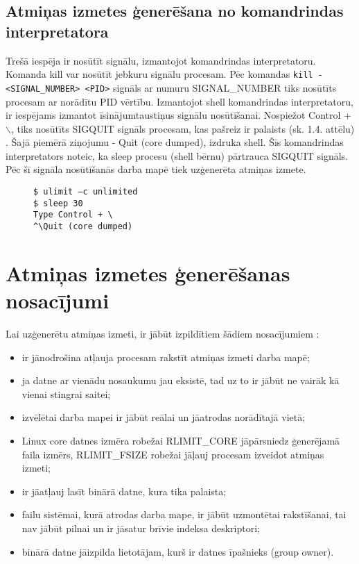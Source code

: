 \subsection{Atmiņas izmetes ģenerēšana no komandrindas interpretatora}
Trešā iespēja ir nosūtīt signālu, izmantojot komandrindas interpretatoru. 
Komanda kill var nosūtīt jebkuru signālu procesam.
Pēc komandas  \texttt{kill -<SIGNAL\_NUMBER> <PID>} signāls ar numuru  SIGNAL\_NUMBER tiks nosūtīts procesam ar norādītu PID vērtību.
Izmantojot shell komandrindas interpretatoru, ir  iespējams izmantot īsinājumtaustiņus signālu nosūtīšanai. 
Nospiežot Control + $\backslash$, tiks nosūtīts SIGQUIT signāls procesam, kas pašreiz ir palaists (sk. 1.4. attēlu) \cite {nosacijumi}. 
Šajā piemērā ziņojumu - Quit (core dumped), izdruka shell. 
Šīs komandrindas interpretators noteic, ka  sleep procesu (shell bērnu) pārtrauca SIGQUIT signāls. 
Pēc šī signāla nosūtīšanās darba mapē tiek uzģenerēta atmiņas izmete. 

\begin{figure}[h]
\begin{lstlisting}[style=customgdb]
$ ulimit –c unlimited
$ sleep 30
Type Control + \
^\Quit (core dumped)
\end{lstlisting}
\caption{\textbf{\fontsize{11}{12}\selectfont {Atmiņas izmetes ģenerēšana, izmantojot īsinājumtaustiņus}}}
\end{figure}
  
\section{Atmiņas izmetes ģenerēšanas nosacījumi}
Lai  uzģenerētu atmiņas izmeti, ir jābūt izpildītiem šādiem nosacījumiem \cite {nosacijumi}:
\begin{itemize}
	\item   ir jānodrošina atļauja procesam rakstīt atmiņas izmeti darba mapē;
	\item 	ja datne ar vienādu nosaukumu jau eksistē, tad uz to ir jābūt ne vairāk kā vienai stingrai saitei;
	\item 	izvēlētai darba mapei ir jābūt reālai un jāatrodas norādītajā vietā;
	\item 	Linux core datnes izmēra robežai {RLIMIT\_CORE} jāpārsniedz ģenerējamā faila izmērs, { RLIMIT\_FSIZE} robežai jāļauj procesam izveidot atmiņas izmeti;
	\item 	ir  jāatļauj lasīt binārā datne, kura tika palaista;
	\item 	failu sistēmai, kurā atrodas darba mape, ir jābūt uzmontētai rakstīšanai, tai nav jābūt pilnai un ir jāsatur brīvie indeksa deskriptori;
	\item 	binārā datne jāizpilda lietotājam, kurš ir datnes īpašnieks (group owner).
\end{itemize} 
 
